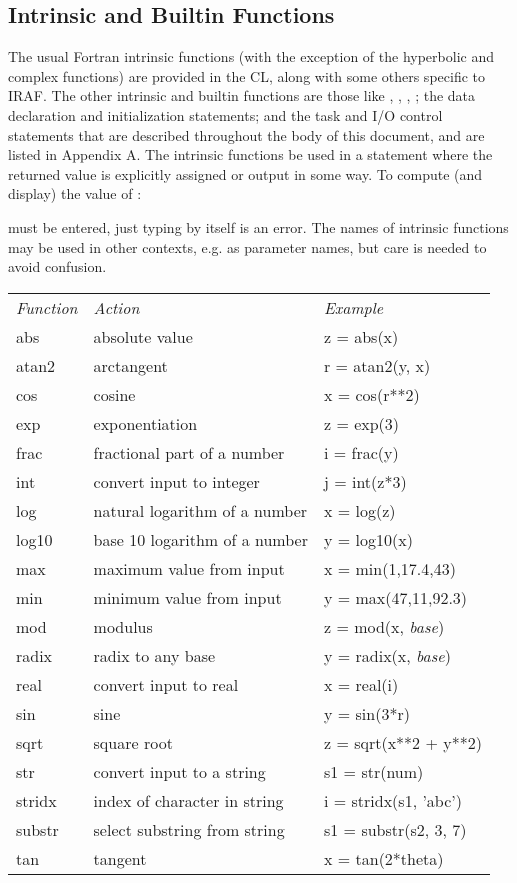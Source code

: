 \subsection{Intrinsic and Builtin Functions}

The usual Fortran intrinsic functions 
(with the exception of the hyperbolic and complex functions)
are provided in the CL,  along with some others specific to IRAF.  
The other intrinsic and builtin functions are those like
, , , ; 
the data declaration and initialization statements; and the
task and I/O control statements that are described throughout 
the body of this document, and are listed in Appendix A.   The intrinsic
functions  be used in a statement where the returned
value is explicitly assigned or output in some way. 
To compute (and display) the value of :

\begin{quotation}\noindent
{} 
\end{quotation}

\noindent
must be entered, just typing  by itself is an error.
The names of intrinsic functions may be used in other contexts, e.g. as
parameter names, but care is needed to avoid confusion.

\begin{tabular}{lll}
{\it Function}  &   {\it Action} 		& {\it Example} \\
    abs &	absolute value			& z = abs(x) \\
    atan2 &	arctangent  			& r = atan2(y, x) \\
    cos &	cosine 				& x = cos(r**2) \\
    exp &	exponentiation 			& z = exp(3) \\
    frac &	fractional part of a number 	& i = frac(y) \\
    int &	convert input to integer 	& j = int(z*3) \\
    log &	natural logarithm of a number 	& x = log(z) \\
    log10 &	base 10 logarithm of a number 	& y = log10(x) \\
    max &	maximum value from input 	& x = min(1,17.4,43) \\
    min &	minimum value from input	& y = max(47,11,92.3) \\
    mod &	modulus 			& z = mod(x, {\it base}) \\
    radix &	radix to any base 		& y = radix(x, {\it base}) \\
    real &	convert input to real 		& x = real(i) \\
    sin &	sine 				& y = sin(3*r) \\
    sqrt &	square root 			& z = sqrt(x**2 + y**2) \\
    str &	convert input to a string 	& s1 = str(num) \\
    stridx &	index of character in string 	& i = stridx(s1, 'abc') \\
    substr &	select substring from string 	& s1 = substr(s2, 3, 7) \\
    tan &	tangent 			& x = tan(2*theta)
\end{tabular}

